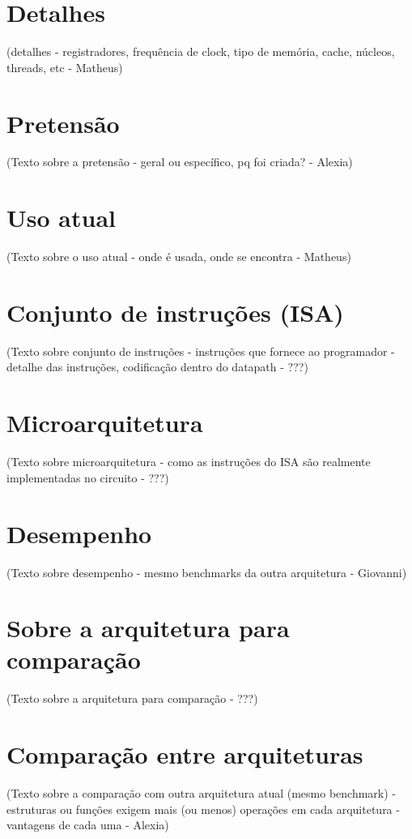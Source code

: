 \documentclass[12pt,a4paper,brazilian,utf8]{ppgsi}
\begin{document}
\section{Detalhes}
    (detalhes - registradores, frequência de clock, tipo de memória, cache, núcleos, threads, etc - Matheus)

\section{Pretensão}
    (Texto sobre a pretensão - geral ou específico, pq foi criada? - Alexia)

\section{Uso atual}
    (Texto sobre o uso atual - onde é usada, onde se encontra - Matheus)

\section{Conjunto de instruções (ISA)}
    (Texto sobre conjunto de instruções - instruções que fornece ao programador - detalhe das instruções, codificação dentro do datapath - ???)

\section{Microarquitetura}
    (Texto sobre microarquitetura - como as instruções do ISA são realmente implementadas no circuito - ???)

\section{Desempenho}
    (Texto sobre desempenho - mesmo benchmarks da outra arquitetura - Giovanni)

\section{Sobre a arquitetura para comparação}
    (Texto sobre a arquitetura para comparação - ???) 

\section{Comparação entre arquiteturas}
    (Texto sobre a comparação com outra arquitetura atual (mesmo benchmark) - estruturas ou funções exigem mais (ou menos) operações em cada arquitetura - vantagens de cada uma - Alexia)
\end{document}
